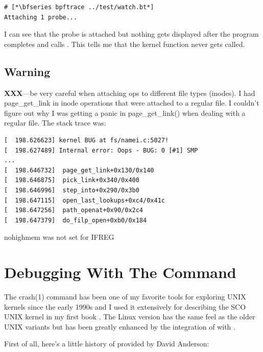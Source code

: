 \begin{lstlisting}
# [*\bfseries bpftrace ../test/watch.bt*]
Attaching 1 probe...
\end{lstlisting}

\noindent
I can see that the probe is attached but nothing gets displayed after the program completes  and calls . This tells me that the kernel  function never gets called.

\subsection{Warning}

\textbf{XXX}---be very careful when attaching ops to different file types (inodes). I had page\_get\_link in inode operations that were attached to a regular file. I couldn't figure out why I was getting a panic in page\_get\_link() when dealing with a regular file. The stack trace was:

\begin{lstlisting}
[  198.626623] kernel BUG at fs/namei.c:5027!
[  198.627489] Internal error: Oops - BUG: 0 [#1] SMP
...
[  198.646732]  page_get_link+0x130/0x140
[  198.646875]  pick_link+0x340/0x400
[  198.646996]  step_into+0x290/0x3b0
[  198.647115]  open_last_lookups+0xc4/0x41c
[  198.647256]  path_openat+0x90/0x2c4
[  198.647379]  do_filp_open+0xb0/0x184
\end{lstlisting}

\noindent
nohighmem was not set for IFREG

\section{Debugging With The  Command}

The {crash(1)} command has been one of my favorite tools for exploring UNIX kernels since the early 1990s and I used it extensively for describing the SCO UNIX kernel in my first book \cite{pate-unix}. The Linux version has the same feel as the older UNIX variants but has been greatly enhanced by the integration of  with . 

First of all, here's a little history of  provided by David Anderson:

